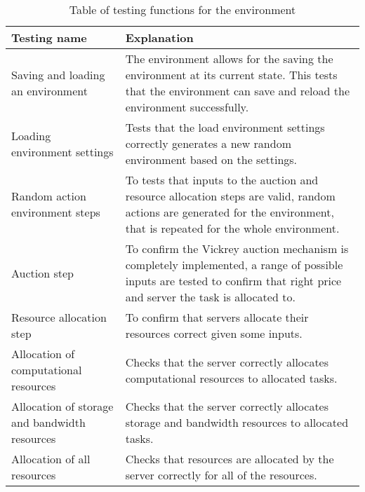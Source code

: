\begin{table}[h]
    \centering
    \begin{tabular}{|p{3cm}|p{8cm}|} \hline
        \textbf{Testing name} & \textbf{Explanation} \\ \hline
        Saving and loading an environment & The environment allows for the saving the environment at its current
            state. This tests that the environment can save and reload the environment successfully. \\ \hline
        Loading environment settings & Tests that the load environment settings correctly generates a new random
            environment based on the settings. \\ \hline
        Random action environment steps & To tests that inputs to the auction and resource allocation steps are valid,
            random actions are generated for the environment, that is repeated for the whole environment.  \\ \hline
        Auction step & To confirm the Vickrey auction mechanism is completely implemented, a range of possible inputs
            are tested to confirm that right price and server the task is allocated to. \\ \hline
        Resource allocation step & To confirm that servers allocate their resources correct given some inputs. \\ \hline
        Allocation of computational resources & Checks that the server correctly allocates computational resources to
            allocated tasks. \\ \hline
        Allocation of storage and bandwidth resources & Checks that the server correctly allocates storage and
            bandwidth resources to allocated tasks. \\ \hline
        Allocation of all resources & Checks that resources are allocated by the server correctly for all of the
            resources. \\ \hline
    \end{tabular}
    \caption{Table of testing functions for the environment}
    \label{tab:env_testing}
\end{table}

